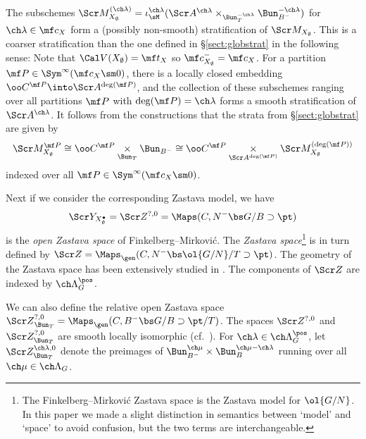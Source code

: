 The subschemes
$\Scr M_{X_\emptyset}^{(\ch\lambda)} = \iota_\sM^{\ch\lambda}(\Scr A^{\ch\lambda} \times_{\Bun_T^{-\ch\lambda}} \Bun_{B^-}^{-\ch\lambda})$ for $\ch\lambda\in \mf c_X$
form a (possibly non-smooth) stratification
of $\Scr M_{X_\emptyset}$.
This is a coarser stratification than the one defined in \S\ref{sect:globstrat}
in the following sense:
Note that $\Cal V(X_\emptyset) = \mf t_X$ so $\mf c_{X_\emptyset}^- = \mf c_X$.
For a partition $\mf P \in \Sym^\infty(\mf c_X\sm 0)$,
there is a locally closed embedding $\oo C^{\mf P} \into \Scr A^{\deg(\mf P)}$, and the collection of these
subschemes ranging over all partitions $\mf P$ with $\deg(\mf P)=\ch\lambda$ forms a smooth
stratification of $\Scr A^{\ch\lambda}$. It follows from the constructions
that the strata from \S\ref{sect:globstrat} are given by
\[ \Scr M^{\mf P}_{X_\emptyset} \cong
\oo C^{\mf P} \underset{\Bun_T}\times \Bun_{B^-} \cong \oo C^{\mf P} \underset{\Scr A^{\deg(\mf P)}}\times \Scr M_{X_\emptyset}^{(\deg(\mf P))} \]
indexed over all $\mf P \in \Sym^\infty(\mf c_X\sm 0)$.



Next if we consider the corresponding Zastava model, we have
\[ \Scr Y_{X^\bullet_\emptyset} = \Scr Z^{?,0}  = \Maps(C, N^- \bs G / B \supset \pt) \]
is the \emph{open Zastava space} of Finkelberg--Mirkovi\'c.
The \emph{Zastava space}\footnote{The Finkelberg--Mirkovi\'c Zastava space
is the Zastava model for $\ol{G/N}$. In this paper we made a slight distinction in
semantics between `model' and `space' to avoid confusion, but the two terms are
interchangeable.} is in turn defined by
$\Scr Z = \Maps_\gen(C, N^- \bs \ol{G/N} / T \supset \pt)$.
The geometry of the Zastava space has been extensively studied
in \cite{FM,FFKM,BFGM}.
The components of $\Scr Z$ are indexed by $\ch\Lambda^\pos_G$.

We can also define the relative open Zastava space
${\Scr Z}^{?,0}_{\Bun_T} = \Maps_\gen(C, B^- \bs G/ B \supset \pt/T)$.
The spaces $\Scr Z^{?,0}$ and $\Scr Z^{?,0}_{\Bun_T}$ are smooth locally isomorphic (cf.~\cite[\S 3.1]{BFGM}).
For $\ch\lambda \in \ch\Lambda^\pos_G$, let $\Scr Z_{\Bun_T}^{\ch\lambda,0}$ denote
the preimages of $\Bun_{B^-}^{\ch\mu} \times \Bun_B^{\ch\mu-\ch\lambda}$
running over all $\ch\mu\in \ch\Lambda_G$.

